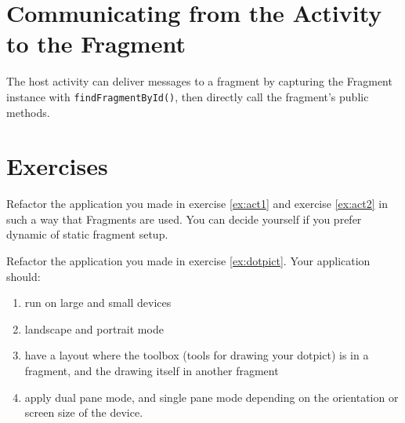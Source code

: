 \section{Communicating from the Activity to the Fragment}
The host activity can deliver messages to a fragment by capturing the Fragment instance with \texttt{findFragmentById()}, then directly call the fragment's public methods.


\section{Exercises}
\begin{exercise}
	Refactor the application you made in exercise \ref{ex:act1} and exercise \ref{ex:act2} in such a way that Fragments are used. You can decide yourself if you prefer dynamic of static fragment setup.
\end{exercise}

\begin{exercise}
	Refactor the application you made in exercise \ref{ex:dotpict}. Your application should:
	\begin{enumerate}
		\item run on large and small devices
		\item landscape and portrait mode
		\item have a layout where the toolbox (tools for drawing your dotpict) is in a fragment, and the drawing itself in another fragment
		\item apply dual pane mode, and single pane mode depending on the orientation or screen size of the device.
	\end{enumerate}
\end{exercise}
